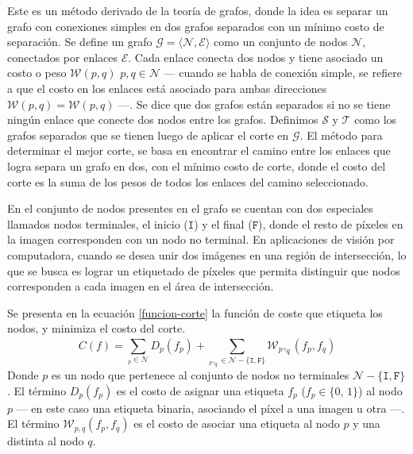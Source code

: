 Este es un método derivado de la teoría de grafos, donde la idea es separar un grafo con conexiones simples en dos grafos separados con un mínimo costo de separación. Se define un grafo $\mathcal{G} = \langle \mathcal{N}, \mathcal{E} \rangle$ como un conjunto de nodos $\mathcal{N}$, conectados por enlaces $\mathcal{E}$. Cada enlace conecta dos nodos y tiene asociado un costo o peso $\mathcal{W}(p, q) \,\, p,q \in \mathcal{N}$ --- cuando se habla de conexión simple, se refiere a que el costo en los enlaces está asociado para ambas direcciones $\mathcal{W}(p, q) = \mathcal{W}(p, q)$ ---. Se dice que dos grafos están separados si no se tiene ningún enlace que conecte dos nodos entre los grafos. Definimos $\mathcal{S}$ y $\mathcal{T}$ como los grafos separados que se tienen luego de aplicar el corte en $\mathcal{G}$. El método para determinar el mejor corte, se basa en encontrar el camino entre los enlaces que logra separa un grafo en dos, con el mínimo costo de corte, donde el costo del corte es la suma de los pesos de todos los enlaces del camino seleccionado.

En el conjunto de nodos presentes en el grafo se cuentan con dos especiales llamados nodos terminales, el inicio ($\mathtt{I}$) y el final ($\mathtt{F}$), donde el resto de píxeles en la imagen corresponden con un nodo no terminal. En aplicaciones de visión por computadora, cuando se desea unir dos imágenes en una región de intersección, lo que se busca es lograr un etiquetado de píxeles que permita distinguir que nodos corresponden a cada imagen en el área de intersección.

Se presenta en la ecuación \ref{funcion-corte} la función de coste que etiqueta los nodos, y minimiza el costo del corte.
\begin{equation}
C(f) = \sum_{_p\in \mathcal{N}}^{} D_p(f_p) + \sum_{_p,_q \in \mathcal{N} - \{\mathtt{I},\mathtt{F}\}}^{} \mathcal{W}_p,_q (f_p, f_q)
\label{funcion-corte}
\end{equation}
Donde $p$ es un nodo que pertenece al conjunto de nodos no terminales $\mathcal{N} - \{\mathtt{I},\mathtt{F}\}$. El término $D_p(f_p)$ es el costo de asignar una etiqueta $f_p$ ($f_p \in \{0,\,1\}$) al nodo $p$ --- en este caso una etiqueta binaria, asociando el píxel a una imagen u otra ---. El término $\mathcal{W}_{p,q} (f_p, f_q)$ es el costo de asociar una etiqueta al nodo $p$ y una distinta al nodo $q$.

